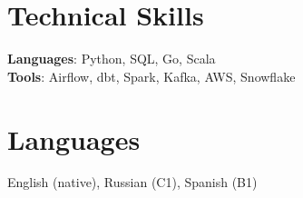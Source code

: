 \documentclass[letterpaper,11pt]{article}
\begin{document}
\section{Technical Skills}
 \begin{itemize}[leftmargin=0.15in, label={}]
    \small{\item{
     \textbf{Languages}{: Python, SQL, Go, Scala} \\
     \textbf{Tools}{: Airflow, dbt, Spark, Kafka, AWS, Snowflake}
    }}
 \end{itemize}

\section{Languages}
 \begin{itemize}[leftmargin=0.15in, label={}]
    \small{\item{English (native), Russian (C1), Spanish (B1)}}
 \end{itemize}
\end{document}
